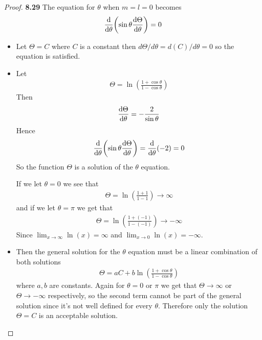 \documentclass[11pt]{article}
\theoremstyle{definition}
\begin{document}
\cleardoublepage
\begin{proof}{\textbf{8.29}}
The equation for $\theta$ when $m = l = 0$ becomes
\begin{align*}
    \dv{\theta}(\sin\theta\dv{\Theta}{\theta}) = 0
\end{align*}
\begin{itemize}
\item [\textbf{(a)}] Let $\Theta = C$ where $C$ is a constant then
$d\Theta/d\theta = d(C)/d\theta = 0$ so the equation is satisfied.
\item [\textbf{(b)}] Let
\begin{align*}
    \Theta = \ln(\frac{1 + \cos\theta}{1 - \cos\theta})
\end{align*}
Then
\begin{align*}
    \dv{\Theta}{\theta} = -\frac{2}{\sin\theta}
\end{align*}
Hence 
\begin{align*}
    \dv{\theta}(\sin\theta\dv{\Theta}{\theta}) = \dv{\theta}(-2) = 0
\end{align*}
So the function $\Theta$ is a solution of the $\theta$ equation.

If we let $\theta = 0$ we see that
\begin{align*}
    \Theta = \ln(\frac{1 + 1}{1 - 1}) \to \infty
\end{align*}
and if we let $\theta = \pi$ we get that
\begin{align*}
    \Theta = \ln(\frac{1 + (-1)}{1 - (-1)}) \to -\infty
\end{align*}
Since $\lim_{x\to \infty} \ln(x) = \infty$ and $\lim_{x\to 0} \ln(x) = -\infty$.

\item [\textbf{(c)}]
Then the general solution for the $\theta$ equation must be a linear combination
of both solutions 
\begin{align*}
    \Theta = aC + b\ln(\frac{1 + \cos\theta}{1 - \cos\theta})
\end{align*}
where $a, b$ are constants. Again for $\theta = 0$ or $\pi$ we get that
$\Theta \to \infty$ or $\Theta \to -\infty$ respectively, so the second term
cannot be part of the general solution since it's not well defined for every
$\theta$. Therefore only the solution $\Theta = C$ is an acceptable solution.
\end{itemize}
\end{proof}
\end{document}
